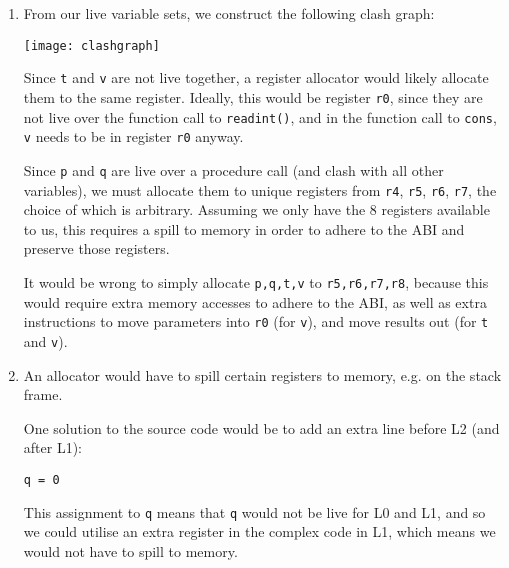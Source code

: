 \begin{enumerate}[label=(\alph*)]
\item
  From our live variable sets, we construct the following clash graph:

  \texttt{[image: clashgraph]}

  Since \texttt{t} and \texttt{v} are not live together, a register allocator would likely allocate them to the same register. Ideally, this would be register \texttt{r0}, since they are not live over the function call to \texttt{readint()}, and in the function call to \texttt{cons}, \texttt{v} needs to be in register \texttt{r0} anyway.

  Since \texttt{p} and \texttt{q} are live over a procedure call (and clash with all other variables), we must allocate them to unique registers from \texttt{r4}, \texttt{r5}, \texttt{r6}, \texttt{r7}, the choice of which is arbitrary. Assuming we only have the 8 registers available to us, this requires a spill to memory in order to adhere to the ABI and preserve those registers.

  It would be wrong to simply allocate \texttt{p,q,t,v} to \texttt{r5,r6,r7,r8}, because this would require extra memory accesses to adhere to the ABI, as well as extra instructions to move parameters into \texttt{r0} (for \texttt{v}), and move results out (for \texttt{t} and \texttt{v}).

\item
  An allocator would have to spill certain registers to memory, e.g. on the stack frame.

  One solution to the source code would be to add an extra line before L2 (and after L1):

  \texttt{q = 0}

  This assignment to \texttt{q} means that \texttt{q} would not be live for L0 and L1, and so we could utilise an extra register in the complex code in L1, which means we would not have to spill to memory.



        
    \end{enumerate}

